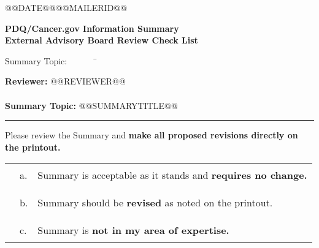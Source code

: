 \documentclass[letterpaper,12pt]{letter}
\begin{document}
\thispagestyle{empty}

@@DATE@@\hfill @@MAILERID@@ \\
\begin{center}
 \textbf{PDQ\textregistered/Cancer.gov Information Summary \\
         External Advisory Board Review Check List}
\end{center}

\vspace{24pt}

\begin{tabbing}

Summary Topic:\ \ \ \ \ \ \  \= \kill

\textbf{Reviewer: } \> @@REVIEWER@@ \\

\\

\textbf{Summary Topic: } \> @@SUMMARYTITLE@@

\end{tabbing}

\rule{6.5in}{.02in}

\vspace{12pt}

Please review the Summary and \textbf{make all proposed revisions 
directly on the printout.}

\vspace{12pt}

\begin{tabular}{llp{4.5in}}
\hspace{.25in}\rule{1in}{.01in} & a. & Summary is acceptable as it stands 
                                       and \textbf{requires no change.} \\
\\
\hspace{.25in}\rule{1in}{.01in} & b. & Summary should be \textbf{revised}
                                       as noted on the printout. \\
\\
\hspace{.25in}\rule{1in}{.01in} & c. & Summary is \textbf{not in my area
                                       of expertise.}
\end{tabular}

\vspace{18pt}
\end{document}
